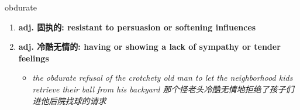 
\begin{frame}
{\huge obdurate}
\begin{center}
\begin{enumerate}\Large
  \item \textbf{adj. 固执的: resistant to persuasion or softening influences}
  \item \textbf{adj. 冷酷无情的: having or showing a lack of sympathy or tender feelings}
  \begin{itemize}
    \item \em{\Large{the obdurate refusal of the crotchety old man to let the neighborhood kids retrieve their ball from his backyard 那个怪老头冷酷无情地拒绝了孩子们进他后院找球的请求}}
  \end{itemize}
\end{enumerate}
\end{center}
\end{frame}
